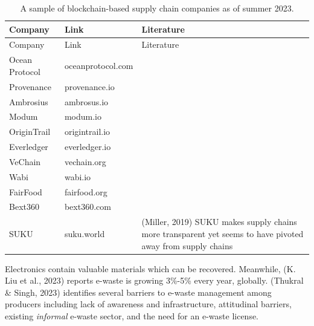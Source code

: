 \documentclass[
  12pt,
  letterpaper,
  DIV=11,
  numbers=noendperiod]{scrartcl}
\begin{document}
\begin{longtable}[]{@{}
  >{\raggedright\arraybackslash}p{}
  >{\raggedright\arraybackslash}p{}
  >{\raggedright\arraybackslash}p{}@{}}
\caption[A Sample of Blockchain-based Supply Chain Companies]{A sample
of blockchain-based supply chain companies as of summer
2023.}\tabularnewline
\toprule\noalign{}
\begin{minipage}[b]{\linewidth}\raggedright
Company
\end{minipage} & \begin{minipage}[b]{\linewidth}\raggedright
Link
\end{minipage} & \begin{minipage}[b]{\linewidth}\raggedright
Literature
\end{minipage} \\
\midrule\noalign{}
\endfirsthead
\toprule\noalign{}
\begin{minipage}[b]{\linewidth}\raggedright
Company
\end{minipage} & \begin{minipage}[b]{\linewidth}\raggedright
Link
\end{minipage} & \begin{minipage}[b]{\linewidth}\raggedright
Literature
\end{minipage} \\
\midrule\noalign{}
\endhead
\bottomrule\noalign{}
\endlastfoot
Ocean Protocol & oceanprotocol.com & \\
Provenance & provenance.io & \\
Ambrosius & ambrosus.io & \\
Modum & modum.io & \\
OriginTrail & origintrail.io & \\
Everledger & everledger.io & \\
VeChain & vechain.org & \\
Wabi & wabi.io & \\
FairFood & fairfood.org & \\
Bext360 & bext360.com & \\
SUKU & suku.world & (Miller, 2019) SUKU makes supply chains more
transparent yet seems to have pivoted away from supply chains \\
\end{longtable}

\let\pandoctableshortcapt\relax

Electronics contain valuable materials which can be recovered.
Meanwhile, (K. Liu et al., 2023) reports e-waste is growing 3\%-5\%
every year, globally. (Thukral \& Singh, 2023) identifies several
barriers to e-waste management among producers including lack of
awareness and infrastructure, attitudinal barriers, existing
\emph{informal} e-waste sector, and the need for an e-waste license.
\end{document}
